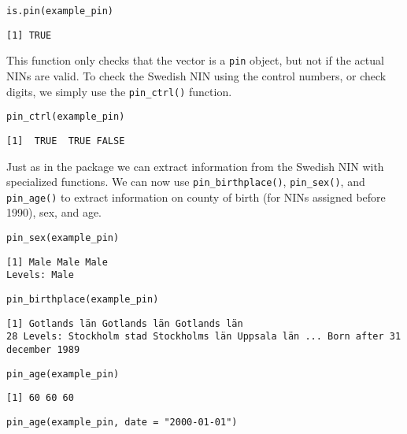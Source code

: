 \begin{verbatim}
is.pin(example_pin)
\end{verbatim}

\begin{verbatim}
[1] TRUE
\end{verbatim}

This function only checks that the vector is a \texttt{pin} object, but not if the actual NINs are valid. To check the Swedish NIN using the control numbers, or check digits, we simply use the \texttt{pin\_ctrl()} function.

\begin{verbatim}
pin_ctrl(example_pin)
\end{verbatim}

\begin{verbatim}
[1]  TRUE  TRUE FALSE
\end{verbatim}

Just as in the  package we can extract information from the Swedish NIN with specialized functions. We can now use \texttt{pin\_birthplace()}, \texttt{pin\_sex()}, and \texttt{pin\_age()} to extract information on county of birth (for NINs assigned before 1990), sex, and age.

\begin{verbatim}
pin_sex(example_pin)
\end{verbatim}

\begin{verbatim}
[1] Male Male Male
Levels: Male
\end{verbatim}

\begin{verbatim}
pin_birthplace(example_pin)
\end{verbatim}

\begin{verbatim}
[1] Gotlands län Gotlands län Gotlands län
28 Levels: Stockholm stad Stockholms län Uppsala län ... Born after 31 december 1989
\end{verbatim}

\begin{verbatim}
pin_age(example_pin)
\end{verbatim}

\begin{verbatim}
[1] 60 60 60
\end{verbatim}

\begin{verbatim}
pin_age(example_pin, date = "2000-01-01")
\end{verbatim}

